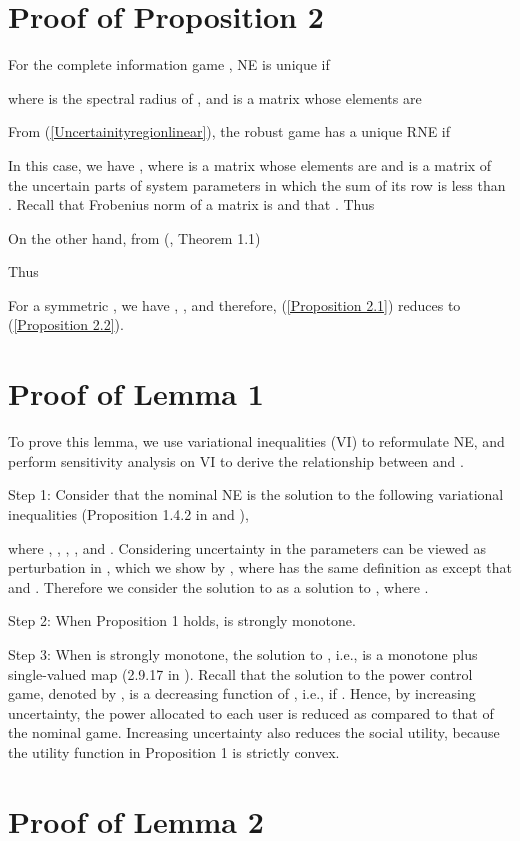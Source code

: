 \documentclass[peerreview,onecolumn,11pt,draftclsnofoot]{IEEEtran}\usepackage{amsmath}\usepackage{amsfonts}\usepackage{epsfig}\usepackage{amssymb}\usepackage{graphicx}\usepackage{amssymb,amsmath}\usepackage{cite}\usepackage{color,soul}\newcommand\T{\rule{0pt}{3.1ex}}
\begin{document}
\section{Proof of Proposition 2}
For the complete information game , NE is unique \cite{Nash1} if

where  is the spectral radius of , and
 is a  matrix whose elements are

From (\ref{Uncertainityregionlinear}), the robust game
 has a unique
RNE if

In this case, we have
,
where  is a  matrix whose elements are 
and  is a matrix of the uncertain parts of
system parameters in which the sum of its
 row is less than
 . Recall that Frobenius norm of a matrix is   and that  . Thus
 
On the other hand, from (\!\!\cite{Matrixanalysis1}, Theorem 1.1)

Thus

For a symmetric , we have ,
,
and therefore, (\ref{Proposition 2.1}) reduces to (\ref{Proposition 2.2}).

\section{Proof of Lemma 1}
To prove this lemma, we use variational inequalities (VI) to reformulate NE, and perform sensitivity analysis on VI to derive the relationship between  and .

Step 1: Consider that the nominal NE is the solution to the following variational inequalities (Proposition 1.4.2 in \cite{PangVI} and \cite{VIintroduction}),

where , , , , and . Considering uncertainty in the parameters can be viewed as perturbation in , which we show by , where  has the same definition as  except that  and . Therefore we consider the solution to  as a solution to , where .

Step 2:  When Proposition 1 holds,  is strongly monotone.

Step 3: When  is strongly monotone, the solution to , i.e.,  is a monotone plus single-valued map (2.9.17 in \cite{PangVI}). Recall that the solution to the power control game, denoted by , is a decreasing function of , i.e., if .
Hence, by increasing uncertainty, the power allocated to each user is reduced as compared to that of the nominal game. Increasing uncertainty also reduces the social utility, because the utility function in Proposition 1 is strictly convex.

\section{Proof of Lemma 2}
\end{document}
